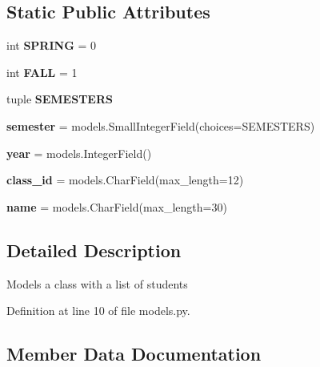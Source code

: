 \subsection*{Static Public Attributes}
\begin{DoxyCompactItemize}
\item 
\hypertarget{classattendance_1_1models_1_1_class_a85600e32f051d44297e8c41cc5855118}{}\label{classattendance_1_1models_1_1_class_a85600e32f051d44297e8c41cc5855118} 
int {\bfseries S\+P\+R\+I\+NG} = 0
\item 
\hypertarget{classattendance_1_1models_1_1_class_aa8f3099c6b5f3e5639cd21cc853d4f05}{}\label{classattendance_1_1models_1_1_class_aa8f3099c6b5f3e5639cd21cc853d4f05} 
int {\bfseries F\+A\+LL} = 1
\item 
tuple {\bfseries S\+E\+M\+E\+S\+T\+E\+RS}
\item 
\hypertarget{classattendance_1_1models_1_1_class_a056117fefce38a1263db4d3fdbb75477}{}\label{classattendance_1_1models_1_1_class_a056117fefce38a1263db4d3fdbb75477} 
{\bfseries semester} = models.\+Small\+Integer\+Field(choices=S\+E\+M\+E\+S\+T\+E\+RS)
\item 
\hypertarget{classattendance_1_1models_1_1_class_a1cf6aa243fe96eaf5b2d41d87d028538}{}\label{classattendance_1_1models_1_1_class_a1cf6aa243fe96eaf5b2d41d87d028538} 
{\bfseries year} = models.\+Integer\+Field()
\item 
\hypertarget{classattendance_1_1models_1_1_class_a0fae21c9886b020e935dcae133c91add}{}\label{classattendance_1_1models_1_1_class_a0fae21c9886b020e935dcae133c91add} 
{\bfseries class\+\_\+id} = models.\+Char\+Field(max\+\_\+length=12)
\item 
\hypertarget{classattendance_1_1models_1_1_class_af4ff4e6bbb4c7a5e4f5a59caeb6670fe}{}\label{classattendance_1_1models_1_1_class_af4ff4e6bbb4c7a5e4f5a59caeb6670fe} 
{\bfseries name} = models.\+Char\+Field(max\+\_\+length=30)
\end{DoxyCompactItemize}


\subsection{Detailed Description}
\begin{DoxyVerb}Models a class with a list of students
\end{DoxyVerb}
 

Definition at line 10 of file models.\+py.



\subsection{Member Data Documentation}
\hypertarget{classattendance_1_1models_1_1_class_a2f46ffdad2531ec27fe1e62f398679f1}{}\label{classattendance_1_1models_1_1_class_a2f46ffdad2531ec27fe1e62f398679f1} 
